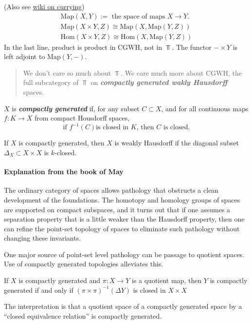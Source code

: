 \begin{remark}
(Also see \href{https://en.wikipedia.org/wiki/Currying#Function_spaces}{wiki on currying})
\begin{align*}
\text{Map}(X,Y):=\text{ the space of maps }X\to Y.\\
\text{Map}(X\times Y,Z)\cong\text{Map}(X,\text{Map}(Y,Z))\\
\text{Hom}(X\times Y,Z)\cong \text{Hom}(X,\text{Map}(Y,Z))
\end{align*}
In the last line, product is product in $\text{CGWH}$, not in $\Top$.
The functor $-\times Y$ is left adjoint to $\text{Map}(Y,-)$.

\begin{quotation}
We don't care so much about $\Top$. We care much more about $\text{CGWH}$, the full subcategory of $\Top$ on \textbf{\textit{compactly generated wakly Hausdorff}} spaces.
\end{quotation}

\begin{definition}
	$X$ is \textbf{\textit{compactly generated}} if, for any subset $C\subset X$, and for all continuous maps $f:K\to X$ from compact Housdorff spaces, \[\text{if } f^{-1}(C) \text{is closed in }K\text{, then } C\text{ is closed}.\]
\end{definition}
\begin{claim}
	If $X$ is compactly generated, then $X$ is weakly Hausdorff if the diagonal subset $\Delta_X\subset X\times X$ is {\color{orange}$k$-closed}.
\end{claim}

\paragraph{Explanation from the book of May} The ordinary category of spaces
allows pathology that obstructs a clean development of the foundations. The
homotopy and homology groups of spaces are supported on compact subspaces, and
it turns out that if one assumes a separation property that is a little weaker
than the Hausdorff property, then one can refine the point-set topology of
spaces to eliminate such pathology without changing these invariants.
	
	One major source of point-set level pathology can be passage to quotient spaces. Use of compactly generated topologies alleviates this.
	\begin{prop}
		If $X$ is compactly generated and $\pi:X\to Y$ is a quotient map, then $Y$ is compactly generated if and only if $(\pi\times \pi)^{-1}(\Delta Y)$ is closed in $X\times X$
	\end{prop}
	The interpretation is that a quotient space of a compactly generated space by a “closed equivalence relation” is compactly generated.


\end{remark}
